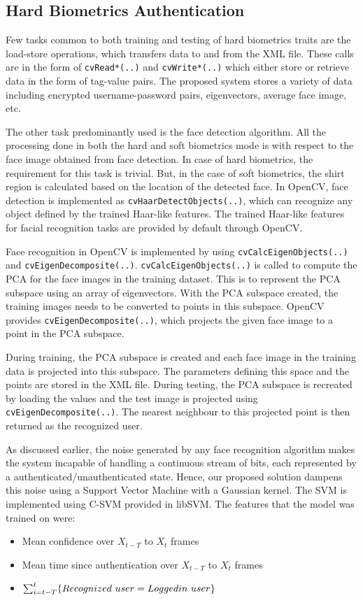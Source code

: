\documentclass[12pt]{report}			%
\begin{document}
\subsection{ Hard Biometrics Authentication }

Few tasks common to both training and testing of hard biometrics traits are the load-store operations, which transfers data to and from the XML file.
These calls are in the form of \verb+cvRead*(..)+ and \verb+cvWrite*(..)+ which either store or retrieve data in the form of tag-value pairs.
The proposed system stores a variety of data including encrypted username-password pairs, eigenvectors, average face image, etc. 

The other task predominantly used is the face detection algorithm.
All the processing done in both the hard and soft biometrics mode is with respect to the face image obtained from face detection.
In case of hard biometrics, the requirement for this task is trivial.
But, in the case of soft biometrics, the shirt region is calculated based on the location of the detected face.
In OpenCV, face detection is implemented as \verb+cvHaarDetectObjects(..)+, which can recognize any object defined by the trained Haar-like features.
The trained Haar-like features for facial recognition tasks are provided by default through OpenCV.

Face recognition in OpenCV is implemented by using \verb+cvCalcEigenObjects(..)+ and \verb+cvEigenDecomposite(..)+. 
\verb+cvCalcEigenObjects(..)+ is called to compute the PCA for the face images in the training dataset.
This is to represent the PCA subspace using an array of eigenvectors.
With the PCA subspace created, the training images needs to be converted to points in this subspace.
OpenCV provides \verb+cvEigenDecomposite(..)+, which projects the given face image to a point in the PCA subspace.

During training, the PCA subspace is created and each face image in the training data is projected into this subspace.
The parameters defining this space and the points are stored in the XML file.
During testing, the PCA subspace is recreated by loading the values and the test image is projected using \verb+cvEigenDecomposite(..)+.
The nearest neighbour to this projected point is then returned as the recognized user.

As discussed earlier, the noise generated by any face recognition algorithm makes the system incapable of handling a continuous stream of bits, each represented by a authenticated/unauthenticated state.
Hence, our proposed solution dampens this noise using a Support Vector Machine with a Gaussian kernel.
The SVM is implemented using C-SVM provided in libSVM\cite{libsvm}.
The features that the model was trained on were:
\begin{itemize}
	\item Mean confidence over $X_{t-T}$ to $X_{t}$ frames
	\item Mean time since authentication over $X_{t-T}$ to $X_{t}$ frames
	\item $\sum_{i=t-T}^{t}\{Recognized\ user = Logged\-in\ user\}$
\end{itemize}
\end{document}
